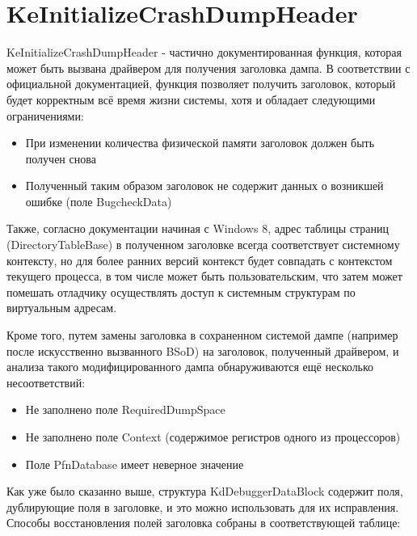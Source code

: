 \documentclass{mipt-thesis-bs}
\begin{document}
\section*{KeInitializeCrashDumpHeader}

KeInitializeCrashDumpHeader - частично документированная функция, которая может быть вызвана драйвером для получения заголовка дампа.
В соответствии с официальной документацией, функция позволяет получить заголовок, который будет корректным всё время жизни системы, хотя и обладает следующими ограничениями:

\begin{itemize}
\item При изменении количества физической памяти заголовок должен быть получен снова
\item Полученный таким образом заголовок не содержит данных о возникшей ошибке (поле BugcheckData)
\end{itemize}

Также, согласно документации начиная с Windows 8, адрес таблицы страниц (DirectoryTableBase) в полученном заголовке всегда соответствует системному контексту, но для более ранних версий контекст будет совпадать с контекстом текущего процесса, в том числе может быть пользовательским, что затем может помешать отладчику осуществлять доступ к системным структурам по виртуальным адресам.

Кроме того, путем замены заголовка в сохраненном системой дампе (например после искусственно вызванного BSoD) на заголовок, полученный драйвером, и анализа такого модифицированного дампа обнаруживаются ещё несколько несоответствий:

\begin{itemize}
\item Не заполнено поле RequiredDumpSpace
\item Не заполнено поле Context (содержимое регистров одного из процессоров)
\item Поле PfnDatabase имеет неверное значение
\end{itemize}

Как уже было сказанно выше, структура KdDebuggerDataBlock содержит поля, дублирующие поля в заголовке, и это можно использовать для их исправления.
Способы восстановления полей заголовка собраны в соответствующей таблице:
\end{document}
